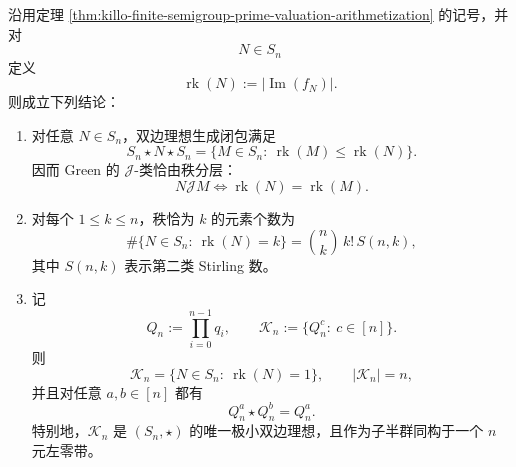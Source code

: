 \begin{theorem}\label{thm:xi-prime-register-green-rank-stratification}
沿用定理 \ref{thm:killo-finite-semigroup-prime-valuation-arithmetization} 的记号，并对
\[
N\in S_n
\]
定义
\[
\operatorname{rk}(N):=|\operatorname{Im}(f_N)|.
\]
则成立下列结论：
\begin{enumerate}
  \item 对任意 \(N\in S_n\)，双边理想生成闭包满足
  \[
  \boxed{\;
  S_n\star N\star S_n
  =
  \{M\in S_n:\ \operatorname{rk}(M)\le \operatorname{rk}(N)\}.\;}
  \]
  因而 Green 的 \(\mathcal J\)-类恰由秩分层：
  \[
  \boxed{\;
  N\mathrel{\mathcal J}M
  \iff
  \operatorname{rk}(N)=\operatorname{rk}(M).\;}
  \]
  \item 对每个 \(1\le k\le n\)，秩恰为 \(k\) 的元素个数为
  \[
  \boxed{\;
  \#\{N\in S_n:\ \operatorname{rk}(N)=k\}
  =
  \binom{n}{k}\,k!\,S(n,k),\;}
  \]
  其中 \(S(n,k)\) 表示第二类 Stirling 数。
  \item 记
  \[
  Q_n:=\prod_{i=0}^{n-1}q_i,
  \qquad
  \mathcal K_n:=\{Q_n^c:\ c\in[n]\}.
  \]
  则
  \[
  \boxed{\;
  \mathcal K_n
  =
  \{N\in S_n:\ \operatorname{rk}(N)=1\},\qquad |\mathcal K_n|=n,\;}
  \]
  并且对任意 \(a,b\in[n]\) 都有
  \[
  \boxed{\;
  Q_n^a\star Q_n^b=Q_n^a.\;}
  \]
  特别地，\(\mathcal K_n\) 是 \((S_n,\star)\) 的唯一极小双边理想，且作为子半群同构于一个 \(n\) 元左零带。
\end{enumerate}
\end{theorem}
